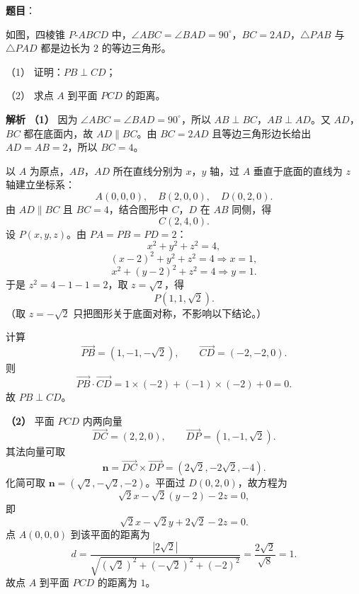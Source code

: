 \begin{answer}

\textbf{题目}：

如图，四棱锥 $P\text{-}ABCD$ 中，$\angle ABC=\angle BAD=90^\circ$，$BC=2AD$，$\triangle PAB$ 与 $\triangle PAD$ 都是边长为 $2$ 的等边三角形。

（1） 证明：$PB\perp CD$；

（2） 求点 $A$ 到平面 $PCD$ 的距离。
\nopagebreak[4]
\begin{center}\end{center}
\nopagebreak[4]
\textbf{解析}
\textbf{（1）} 因为 $\angle ABC=\angle BAD=90^\circ$，所以 $AB\perp BC$，$AB\perp AD$。又 $AD$，$BC$ 都在底面内，故 $AD\parallel BC$。由 $BC=2AD$ 且等边三角形边长给出 $AD=AB=2$，所以 $BC=4$。

以 $A$ 为原点，$AB$，$AD$ 所在直线分别为 $x$，$y$ 轴，过 $A$ 垂直于底面的直线为 $z$ 轴建立坐标系：
\nopagebreak[4]
\[A(0,0,0),\quad B(2,0,0),\quad D(0,2,0).\]
由 $AD\parallel BC$ 且 $BC=4$，结合图形中 $C$，$D$ 在 $AB$ 同侧，得
\nopagebreak[4]
\[C(2,4,0).\]
设 $P(x,y,z)$。由 $PA=PB=PD=2$：
\nopagebreak[4]
\[x^2+y^2+z^2=4,\]
\nopagebreak[4]
\[(x-2)^2+y^2+z^2=4\Longrightarrow x=1,\]
\nopagebreak[4]
\[x^2+(y-2)^2+z^2=4\Longrightarrow y=1.\]
于是 $z^2=4-1-1=2$，取 $z=\sqrt2$，得
\nopagebreak[4]
\[P(1,1,\sqrt2).\]
（取 $z=-\sqrt2$ 只把图形关于底面对称，不影响以下结论。）

计算
\nopagebreak[4]
\[\overrightarrow{PB}=(1,-1,-\sqrt2),\qquad
\overrightarrow{CD}=(-2,-2,0).\]
则
\nopagebreak[4]
\[\overrightarrow{PB}\cdot\overrightarrow{CD}
=1\times(-2)+(-1)\times(-2)+0=0.\]
故 $PB\perp CD$。

\textbf{（2）} 平面 $PCD$ 内两向量
\nopagebreak[4]
\[\overrightarrow{DC}=(2,2,0),\qquad
\overrightarrow{DP}=(1,-1,\sqrt2).\]
其法向量可取
\nopagebreak[4]
\[\boldsymbol n=\overrightarrow{DC}\times\overrightarrow{DP}
=(2\sqrt2,-2\sqrt2,-4).\]
化简可取 $\boldsymbol n=(\sqrt2,-\sqrt2,-2)$。平面过 $D(0,2,0)$，故方程为
\nopagebreak[4]
\[\sqrt2x-\sqrt2(y-2)-2z=0,\]
即
\nopagebreak[4]
\[\sqrt2x-\sqrt2y+2\sqrt2-2z=0.\]
点 $A(0,0,0)$ 到该平面的距离为
\nopagebreak[4]
\[d=\frac{|2\sqrt2|}
{\sqrt{(\sqrt2)^2+(-\sqrt2)^2+(-2)^2}}
=\frac{2\sqrt2}{\sqrt8}=1.\]
故点 $A$ 到平面 $PCD$ 的距离为 $1$。



\end{answer}
